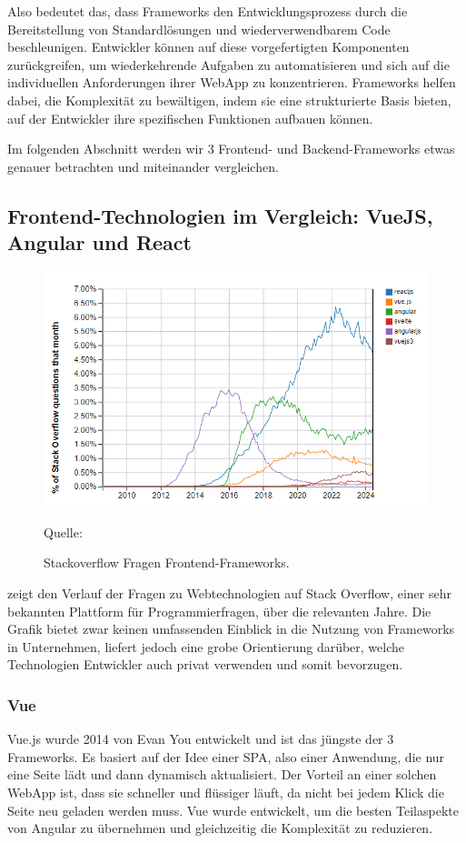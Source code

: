 \documentclass[biblatex]{lni}
\begin{document}
Also bedeutet das,
dass Frameworks den Entwicklungsprozess durch die Bereitstellung von Standardlösungen und wiederverwendbarem Code beschleunigen.
Entwickler können auf diese vorgefertigten Komponenten zurückgreifen,
um wiederkehrende Aufgaben zu automatisieren und sich auf die individuellen Anforderungen ihrer \ac{WebApp} zu konzentrieren.
Frameworks helfen dabei, die Komplexität zu bewältigen,
indem sie eine strukturierte Basis bieten, auf der Entwickler ihre spezifischen Funktionen aufbauen können.

Im folgenden Abschnitt werden wir 3 Frontend- und Backend-Frameworks etwas genauer betrachten und miteinander vergleichen.

\subsection{Frontend-Technologien im Vergleich: VueJS, Angular und React}

\begin{figure}
  \centering
  \includegraphics[width=.8\textwidth]{fetrends}
  \caption{Stackoverflow Fragen Frontend-Frameworks.}
  \label{fig:fetrends}
  \vspace{-0.3cm}
  \begin{center}
    \footnotesize Quelle: \cite{SOTrend}
  \end{center}
\end{figure}

 zeigt den Verlauf der Fragen zu Webtechnologien auf Stack Overflow,
einer sehr bekannten Plattform für Programmierfragen, über die relevanten Jahre.
Die Grafik bietet zwar keinen umfassenden Einblick in die Nutzung von Frameworks in Unternehmen,
liefert jedoch eine grobe Orientierung darüber, welche Technologien Entwickler auch privat verwenden und somit bevorzugen.

\subsubsection{Vue}
Vue.js wurde 2014 von Evan You entwickelt und ist das jüngste der 3 Frameworks. \cite{AmD}
Es basiert auf der Idee einer \ac{SPA}, also einer Anwendung, die nur eine Seite lädt und dann dynamisch aktualisiert. \cite{BStack}
Der Vorteil an einer solchen \ac{WebApp} ist, dass sie schneller und flüssiger läuft,
da nicht bei jedem Klick die Seite neu geladen werden muss.
Vue wurde entwickelt, um die besten Teilaspekte von Angular zu übernehmen und gleichzeitig die Komplexität zu reduzieren.
\end{document}
